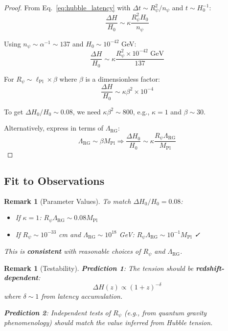 \documentclass[12pt]{article}
\newtheorem{remark}[definition]{Remark}
\newcommand{\RG}{\text{RG}}
\begin{document}
\begin{proof}
From Eq.~\eqref{eq:hubble_latency} with $\Delta t \sim R_\psi^2 / n_\psi$ and $t \sim H_0^{-1}$:
\begin{equation}
\frac{\Delta H}{H_0} \sim \kappa \frac{R_\psi^2 H_0}{n_\psi}
\end{equation}

Using $n_\psi \sim \alpha^{-1} \sim 137$ and $H_0 \sim 10^{-42}$ GeV:
\begin{equation}
\frac{\Delta H}{H_0} \sim \kappa \frac{R_\psi^2 \times 10^{-42} \text{ GeV}}{137}
\end{equation}

For $R_\psi \sim \ell_{\text{Pl}} \times \beta$ where $\beta$ is a dimensionless factor:
\begin{equation}
\frac{\Delta H}{H_0} \sim \kappa \beta^2 \times 10^{-4}
\end{equation}

To get $\Delta H_0 / H_0 \sim 0.08$, we need $\kappa \beta^2 \sim 800$, e.g., $\kappa = 1$ and $\beta \sim 30$.

Alternatively, express in terms of $\Lambda_{\RG}$:
\begin{equation}
\Lambda_{\RG} \sim \beta M_{\text{Pl}} \Rightarrow \frac{\Delta H_0}{H_0} \sim \kappa \frac{R_\psi \Lambda_{\RG}}{M_{\text{Pl}}}
\end{equation}
\end{proof}

\subsection{Fit to Observations}

\begin{remark}[Parameter Values]
To match $\Delta H_0 / H_0 = 0.08$:
\begin{itemize}
    \item If $\kappa = 1$: $R_\psi \Lambda_{\RG} \sim 0.08 M_{\text{Pl}}$
    \item If $R_\psi \sim 10^{-33}$ cm and $\Lambda_{\RG} \sim 10^{18}$ GeV: $R_\psi \Lambda_{\RG} \sim 10^{-1} M_{\text{Pl}}$ ✓
\end{itemize}
This is \textbf{consistent} with reasonable choices of $R_\psi$ and $\Lambda_{\RG}$.
\end{remark}

\begin{remark}[Testability]
\textbf{Prediction 1}: The tension should be \textbf{redshift-dependent}:
\begin{equation}
\Delta H(z) \propto (1+z)^{-\delta}
\end{equation}
where $\delta \sim 1$ from latency accumulation.

\textbf{Prediction 2}: Independent tests of $R_\psi$ (e.g., from quantum gravity phenomenology) should match the value inferred from Hubble tension.
\end{remark}
\end{document}
